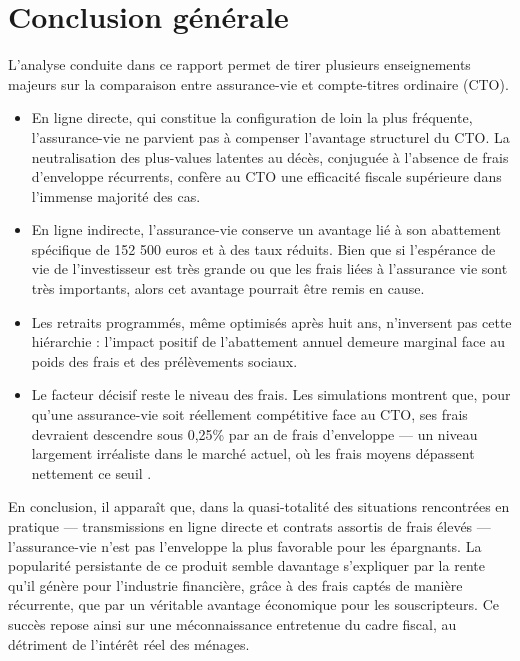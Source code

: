 \section*{Conclusion générale}
\label{sec:conclusion}

L'analyse conduite dans ce rapport permet de tirer plusieurs enseignements majeurs sur la comparaison entre assurance-vie et compte-titres ordinaire (CTO).
\begin{itemize}
    \item En ligne directe, qui constitue la configuration de loin la plus fréquente, l'assurance-vie ne parvient pas à compenser l'avantage structurel du CTO. La neutralisation des plus-values latentes au décès, conjuguée à l'absence de frais d'enveloppe récurrents, confère au CTO une efficacité fiscale supérieure dans l'immense majorité des cas.
    \item En ligne indirecte, l'assurance-vie conserve un avantage lié à son abattement spécifique de 152 500 euros et à des taux réduits. Bien que si l'espérance de vie de l'investisseur est très grande ou que les frais liées à l'assurance vie sont très importants, alors cet avantage pourrait être remis en cause.
    \item Les retraits programmés, même optimisés après huit ans, n'inversent pas cette hiérarchie : l'impact positif de l'abattement annuel demeure marginal face au poids des frais et des prélèvements sociaux.
    \item Le facteur décisif reste le niveau des frais. Les simulations montrent que, pour qu'une assurance-vie soit réellement compétitive face au CTO, ses frais devraient descendre sous 0,25\% par an de frais d'enveloppe — un niveau largement irréaliste dans le marché actuel, où les frais moyens dépassent nettement ce seuil \cite{rapport_observatoire_epargne_2025}.
\end{itemize}

En conclusion, il apparaît que, dans la quasi-totalité des situations rencontrées en pratique — transmissions en ligne directe et contrats assortis de frais élevés — l'assurance-vie n'est pas l'enveloppe la plus favorable pour les épargnants. La popularité persistante de ce produit semble davantage s'expliquer par la rente qu'il génère pour l'industrie financière, grâce à des frais captés de manière récurrente, que par un véritable avantage économique pour les souscripteurs. Ce succès repose ainsi sur une méconnaissance entretenue du cadre fiscal, au détriment de l'intérêt réel des ménages.
